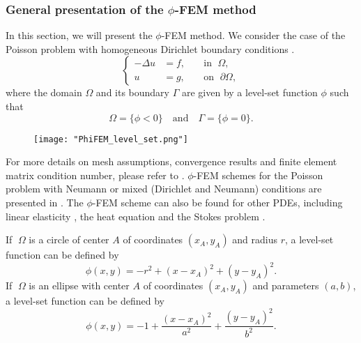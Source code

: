 \subsubsection{General presentation of the $\phi$-FEM method} \label{FEMs.PhiFEM.Pres}

In this section, we will present the $\phi$-FEM method. We consider the case of the Poisson problem with homogeneous Dirichlet boundary conditions \cite{duprez_phi-fem_2020}. 
\begin{equation}
	\left\{
	\begin{aligned}
		-\Delta u &= f, \; &&\text{in } \; \Omega, \\
		u&=g, \; &&\text{on } \; \partial\Omega,
	\end{aligned}
	\right.
	\label{eq.Poisson}
\end{equation}
where the domain $\Omega$ and its boundary $\Gamma$ are given by a level-set function $\phi$ such that
\begin{equation*}
	\Omega=\{\phi < 0\} \quad \text{and} \quad \Gamma=\{\phi = 0\}.
\end{equation*}

\begin{figure}[H]
	\centering
	\texttt{[image: "PhiFEM\_level\_set.png"]}
	\label{space1}
\end{figure}

\begin{Rem}
	For more details on mesh assumptions, convergence results and finite element matrix condition number, please refer to \cite{duprez_phi-fem_2020}. $\phi$-FEM schemes for the Poisson problem with Neumann or mixed (Dirichlet and Neumann) conditions are presented in \cite{duprez_new_2023,cotin_phi-fem_nodate}. The $\phi$-FEM scheme can also be found for other PDEs, including linear elasticity \cite[Chapter~2]{cotin_phi-fem_nodate}, the heat equation \cite[Chapter~5]{cotin_phi-fem_nodate} and the Stokes problem \cite{duprez_phi-fem_2023}.
\end{Rem}

\begin{Example}
	If $\; \Omega$ is a circle of center $A$ of coordinates $(x_A,y_A)$ and radius $r$, a level-set function can be defined by
	\begin{equation*}
		\phi(x,y)=-r^2+(x-x_A)^2+(y-y_A)^2.
	\end{equation*}
	If $\; \Omega$ is an ellipse with center $A$ of coordinates $(x_A,y_A)$ and parameters $(a,b)$, a level-set function can be defined by
	\begin{equation*}
		\phi(x,y)=-1+\frac{(x-x_A)^2}{a^2}+\frac{(y-y_A)^2}{b^2}.
	\end{equation*}
\end{Example}

